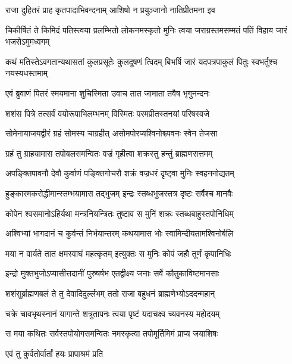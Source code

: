 \twolineshloka
{राजा दुहितरं प्राह कृतपादाभिवन्दनाम्}
{आशिषो न प्रयुञ्जानो नातिप्रीतमना इव}%

\fourlineindentedshloka
{चिकीर्षितं ते किमिदं पतिस्त्वया}
{प्रलम्भितो लोकनमस्कृतो मुनिः}
{त्वया जराग्रस्तमसम्मतं पतिं}
{विहाय जारं भजसेऽमुमध्वगम्}%

\twolineshloka
{कथं मतिस्तेऽवगतान्यथासतां कुलप्रसूतेः कुलदूषणं त्विदम्}
{बिभर्षि जारं यदपत्रपाकुलं पितुः स्वभर्तुश्च नयस्यधस्तमाम्}%

\twolineshloka
{एवं ब्रुवाणं पितरं स्मयमाना शुचिस्मिता}
{उवाच तात जामाता तवैष भृगुनन्दनः}%

\twolineshloka
{शशंस पित्रे तत्सर्वं वयोरूपाभिलम्भनम्}
{विस्मितः परमप्रीतस्तनयां परिषस्वजे}%

\twolineshloka
{सोमेनायाजयद्वीरं ग्रहं सोमस्य चाग्रहीत्}
{असोमपोरप्यश्विनोश्च्यवनः स्वेन तेजसा}%

\twolineshloka
{ग्रहं तु ग्राहयामास तपोबलसमन्वितः}
{वज्रं गृहीत्वा शक्रस्तु हन्तुं ब्राह्मणसत्तमम्}%

\twolineshloka
{अपङ्क्तिपावनौ देवौ कुर्वाणं पङ्क्तिगोचरौ}
{शक्रं वज्रधरं दृष्ट्वा मुनिः स्वहननोद्यतम्}%

\twolineshloka
{हुङ्कारमकरोद्धीमान्स्तम्भयामास तद्भुजम्}
{इन्द्रः स्तब्धभुजस्तत्र दृष्टः सर्वैश्च मानवैः}%

\twolineshloka
{कोपेन श्वसमानोऽहिर्यथा मन्त्रनियन्त्रितः}
{तुष्टाव स मुनिं शक्रः स्तब्धबाहुस्तपोनिधिम्}%

\twolineshloka
{अश्विभ्यां भागदानं च कुर्वन्तं निर्भयान्तरम्}
{कथयामास भोः स्वामिन्दीयतामश्विनोर्बलि}%

\twolineshloka
{मया न वार्यते तात क्षमस्वाघं महत्कृतम्}
{इत्युक्तः स मुनिः कोपं जहौ तूर्णं कृपानिधिः}%

\twolineshloka
{इन्द्रो मुक्तभुजोऽप्यासीत्तदानीं पुरुषर्षभ}
{एतद्वीक्ष्य जनाः सर्वे कौतुकाविष्टमानसाः}%

\twolineshloka
{शशंसुर्ब्राह्मणबलं ते तु देवादिदुर्ल्लभम्}
{ततो राजा बहुधनं ब्राह्मणेभ्योऽददन्महान्}%

\twolineshloka
{चक्रे चावभृथस्नानं यागान्ते शत्रुतापनः}
{त्वया पृष्टं यदाचक्ष्व च्यवनस्य महोदयम्}%

\twolineshloka
{स मया कथितः सर्वस्तपोयोगसमन्वितः}
{नमस्कृत्वा तपोमूर्तिमिमं प्राप्य जयाशिषः}%



\onelineshloka
{एवं तु कुर्वतोर्वार्तां हयः प्रापाश्रमं प्रति}%

